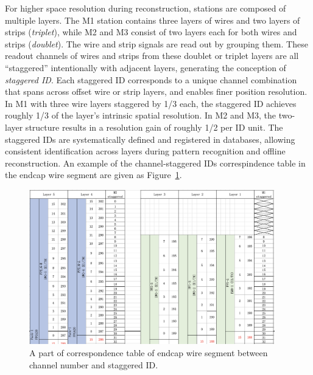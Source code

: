 For higher space resolution during reconstruction, stations are composed of multiple layers. The M1 station contains three layers of wires and two layers of strips (\textit{triplet}), while M2 and M3 consist of two layers each for both wires and strips (\textit{doublet}). The wire and strip signals are read out by grouping them. These readout channels of wires and strips from these doublet or triplet layers are all ``staggered'' intentionally with adjacent layers, generating the conception of \textit{staggered ID}. Each staggered ID corresponds to a unique channel combination that spans across offset wire or strip layers, and enables finer position resolution. In M1 with three wire layers staggered by 1/3 each, the staggered ID achieves roughly 1/3 of the layer's intrinsic spatial resolution. In M2 and M3, the two-layer structure results in a resolution gain of roughly 1/2 per ID unit. The staggered IDs are systematically defined and registered in databases, allowing consistent identification across layers during pattern recognition and offline reconstruction. An example of the channel-staggered IDs correspindence table in the endcap wire segment are given as Figure~\ref{fig:staggeredID}.

\begin{figure}[htbp]
  \centering
  \includegraphics[width=0.95\textwidth]{figs/chapter2/staggeredID_small.png}
  \caption{A part of correspondence table of endcap wire segment between channel number and staggered ID.}
  \label{fig:staggeredID}
\end{figure}

